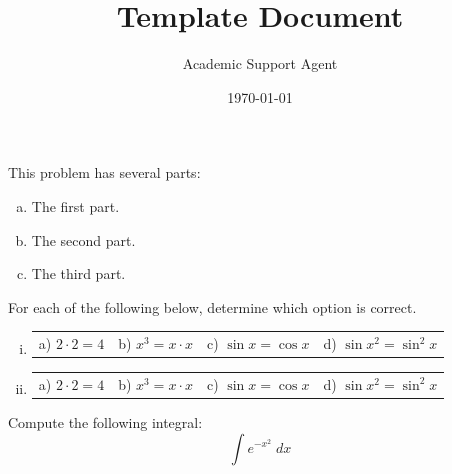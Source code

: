 \documentclass{article}
\title{Template Document}
\author{Academic Support Agent}
\date{\today}
\begin{document}
\maketitle



\begin{exercise}
This problem has several parts:
	\begin{enumerate}[(a)]
	\item The first part.
	\item The second part. 
	\item The third part. 
	\end{enumerate}
\end{exercise}



\begin{exercise}
For each of the following below, determine which option is correct.
\begin{enumerate}[(i)]
\item 
        \begin{tabular}{p{3cm}p{3cm}p{3cm}p{3cm}}
        a) $2 \cdot 2= 4$ & b) $x^3= x \cdot x$ & c) $\sin x = \cos x$ & d) $\sin x^2= \sin^2 x$
        \end{tabular} 
        \item
        \begin{tabular}{p{3cm}p{3cm}p{3cm}p{3cm}}
        a) $2 \cdot 2= 4$ & b) $x^3= x \cdot x$ & c) $\sin x = \cos x$ & d) $\sin x^2= \sin^2 x$
        \end{tabular} 
\end{enumerate}
\end{exercise}



\begin{exercise}
Compute the following integral:
	\[
	\int e^{-x^2} \;dx
	\] \vspace{6cm}
\end{exercise}
\end{document}
